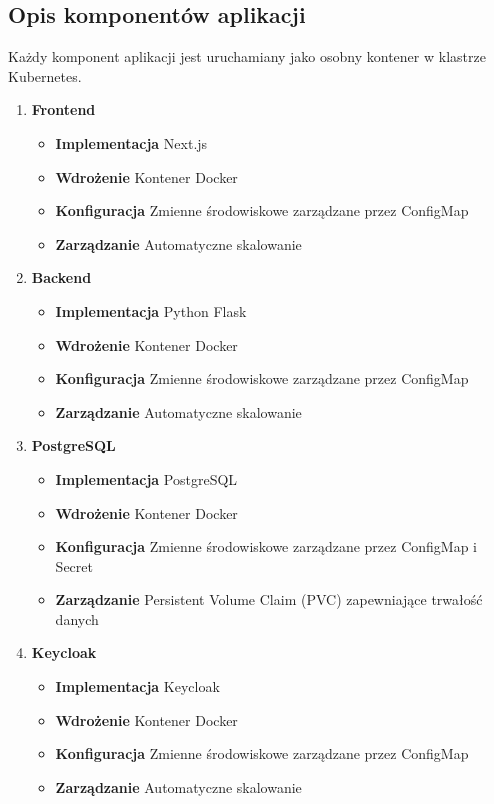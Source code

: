 \documentclass[12pt,a4paper]{article}
\begin{document}
\subsection{Opis komponentów aplikacji}
\label{sec:FunctionalConditions}

Każdy komponent aplikacji jest uruchamiany jako osobny kontener w klastrze Kubernetes.
\begin{enumerate}
    \item \textbf{Frontend}
    \begin{itemize}
        \item \textbf{Implementacja} Next.js
        \item \textbf{Wdrożenie} Kontener Docker
        \item \textbf{Konfiguracja} Zmienne środowiskowe zarządzane przez ConfigMap
        \item \textbf{Zarządzanie} Automatyczne skalowanie
    \end{itemize}
    \item \textbf{Backend}
    \begin{itemize}
        \item \textbf{Implementacja} Python Flask
        \item \textbf{Wdrożenie} Kontener Docker
        \item \textbf{Konfiguracja}  Zmienne środowiskowe zarządzane przez ConfigMap
        \item \textbf{Zarządzanie} Automatyczne skalowanie
    \end{itemize}
    \item \textbf{PostgreSQL}
    \begin{itemize}
        \item \textbf{Implementacja} PostgreSQL
        \item \textbf{Wdrożenie} Kontener Docker
        \item \textbf{Konfiguracja} Zmienne środowiskowe zarządzane przez ConfigMap i Secret
        \item \textbf{Zarządzanie} Persistent Volume Claim (PVC) zapewniające trwałość danych
    \end{itemize}
    \item \textbf{Keycloak}
    \begin{itemize}
        \item \textbf{Implementacja} Keycloak
        \item \textbf{Wdrożenie} Kontener Docker
        \item \textbf{Konfiguracja} Zmienne środowiskowe zarządzane przez ConfigMap
        \item \textbf{Zarządzanie} Automatyczne skalowanie
    \end{itemize}
\end{enumerate}
\newpage
\end{document}
